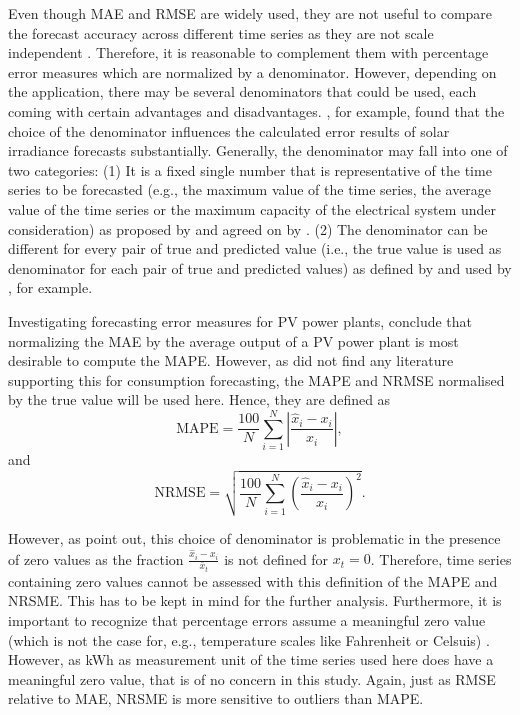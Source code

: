 Even though MAE and RMSE are widely used, they are not useful to compare the forecast accuracy across different time series as they are not scale independent \citep{Meer:2018}. Therefore, it is reasonable to complement them with percentage error measures which are normalized by a denominator. However, depending on the application, there may be several denominators that could be used, each coming with certain advantages and disadvantages. \citet{Hoff:2013}, for example, found that the choice of the denominator influences the calculated error results of solar irradiance forecasts substantially. Generally, the denominator may fall into one of two categories: (1) It is a fixed single number that is representative of the time series to be forecasted (e.g., the maximum value of the time series, the average value of the time series or the maximum capacity of the electrical system under consideration) as proposed by \citet{Hoff:2013} and agreed on by \citet{Meer:2018}. (2) The denominator can be different for every pair of true and predicted value (i.e., the true value is used as denominator for each pair of true and predicted values) as defined by \citet{Hyndman:2006} and used by \citet{xie:2018}, for example. 

Investigating forecasting error measures for PV power plants, \citet{Hoff:2013} conclude that normalizing the MAE by the average output of a PV power plant is most desirable to compute the MAPE. However, as \citet{Meer:2018} did not find any literature supporting this for consumption forecasting, the MAPE and NRMSE normalised by the true value will be used here. Hence, they are defined as
%
\begin{equation} \label{Eq:MAPE}
\text{MAPE}=\frac{100}{N}\sum_{i=1}^N\left|\frac{\widehat{x}_i-x_i}{x_i}\right|,
\end{equation}
and
\begin{equation} \label{Eq:NRMSE}
\text{NRMSE}=\sqrt{\frac{100}{N}\sum_{i=1}^N\left(\frac{\widehat{x}_i-x_i}{x_i}\right)^2}.
\end{equation}

\noindent However, as \citet{Hyndman:2006} point out, this choice of denominator is problematic in the presence of zero values as the fraction $\frac{\widehat{x}_i-x_i}{\bar{x}_t}$ is not defined for $x_t=0$. Therefore, time series containing zero values cannot be assessed with this definition of the MAPE and NRSME. This has to be kept in mind for the further analysis. Furthermore, it is important to recognize that percentage errors assume a meaningful zero value (which is not the case for, e.g., temperature scales like Fahrenheit or Celsuis) \citep{Hyndman:2006}. However, as kWh as measurement unit of the time series used here does have a meaningful zero value, that is of no concern in this study. Again, just as RMSE relative to MAE, NRSME is more sensitive to outliers than MAPE.



